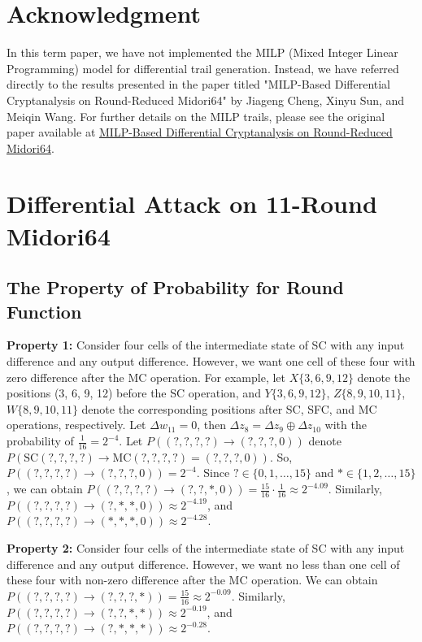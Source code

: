 \documentclass[journal=tosc,preprint]{iacrtrans}
\begin{document}
    \section*{Acknowledgment}
    In this term paper, we have not implemented the MILP (Mixed Integer Linear Programming) model for differential trail generation. Instead, we have referred directly to the results presented in the paper titled "MILP-Based Differential Cryptanalysis on Round-Reduced Midori64" by Jiageng Cheng, Xinyu Sun, and Meiqin Wang. For further details on the MILP trails, please see the original paper available at \href{'../references/MILP-Based\_Differential\_Cryptanalysis\_on\_Round-Reducedi\_Midori64.pdf'}{MILP-Based Differential Cryptanalysis on Round-Reduced Midori64}.

    \section{Differential Attack on 11-Round Midori64}

    \subsection{The Property of Probability for Round Function}

    \textbf{Property 1:} Consider four cells of the intermediate state of SC with any input difference and any output difference. However, we want one cell of these four with zero difference after the MC operation. For example, let $X\{3, 6, 9, 12\}$ denote the positions (3, 6, 9, 12) before the SC operation, and $Y\{3, 6, 9, 12\}$, $Z\{8, 9, 10, 11\}$, $W\{8, 9, 10, 11\}$ denote the corresponding positions after SC, SFC, and MC operations, respectively. Let $\Delta w_{11} = 0$, then $\Delta z_8 = \Delta z_9 \oplus \Delta z_{10}$ with the probability of $\frac{1}{16} = 2^{-4}$. Let $P((?, ?, ?, ?) \to (?, ?, ?, 0))$ denote $P(\text{SC}(?, ?, ?, ?) \to \text{MC}(?, ?, ?, ?) = (?, ?, ?, 0))$. So, $P((?, ?, ?, ?) \to (?, ?, ?, 0)) = 2^{-4}$. Since $? \in \{0, 1, \dots, 15\}$ and $\ast \in \{1, 2, \dots, 15\}$, we can obtain $P((?, ?, ?, ?) \to (?, ?, \ast, 0)) = \frac{15}{16} \cdot \frac{1}{16} \approx 2^{-4.09}$. Similarly, $P((?, ?, ?, ?) \to (?, \ast, \ast, 0)) \approx 2^{-4.19}$, and $P((?, ?, ?, ?) \to (\ast, \ast, \ast, 0)) \approx 2^{-4.28}$.

    \textbf{Property 2:} Consider four cells of the intermediate state of SC with any input difference and any output difference. However, we want no less than one cell of these four with non-zero difference after the MC operation. We can obtain $P((?, ?, ?, ?) \to (?, ?, ?, \ast)) = \frac{15}{16} \approx 2^{-0.09}$. Similarly, $P((?, ?, ?, ?) \to (?, ?, \ast, \ast)) \approx 2^{-0.19}$, and $P((?, ?, ?, ?) \to (?, \ast, \ast, \ast)) \approx 2^{-0.28}$.
\end{document}
